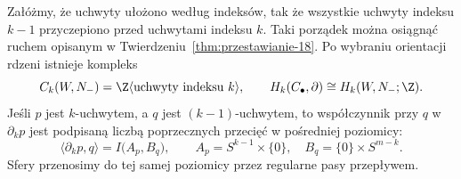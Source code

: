 \begin{twierdzenie}
\label{thm:kompleks-uchwytow-18}
Załóżmy, że uchwyty ułożono według indeksów,
tak że wszystkie uchwyty indeksu $k-1$
przyczepiono przed uchwytami indeksu $k$.
Taki porządek można osiągnąć ruchem opisanym
w Twierdzeniu~\ref{thm:przestawianie-18}.
Po wybraniu orientacji rdzeni istnieje kompleks
\[
 C_k(W,N_-)=\Z\langle
       \text{uchwyty indeksu }k\rangle,
 \qquad H_k(C_\bullet,\partial)\cong H_k(W,N_-;\Z).
\]
Jeśli $p$ jest $k$-uchwytem, a $q$ jest
$(k-1)$-uchwytem, to współczynnik przy $q$
w $\partial_k p$ jest podpisaną liczbą
poprzecznych przecięć w pośredniej poziomicy:
\begin{equation}\label{eq:macierz-uchwyty-18}
 \langle\partial_kp,q\rangle
 = I\bigl(A_p,B_q\bigr),\qquad
 A_p=S^{k-1}\times\{0\},\quad
 B_q=\{0\}\times S^{m-k}.
\end{equation}
Sfery przenosimy do tej samej poziomicy
przez regularne pasy przepływem.
\end{twierdzenie}
